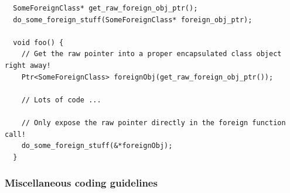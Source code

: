 \begin{itemize}
{\small\begin{verbatim}
  SomeForeignClass* get_raw_foreign_obj_ptr();
  do_some_foreign_stuff(SomeForeignClass* foreign_obj_ptr);

  void foo() {
    // Get the raw pointer into a proper encapsulated class object right away!
    Ptr<SomeForeignClass> foreignObj(get_raw_foreign_obj_ptr());

    // Lots of code ...

    // Only expose the raw pointer directly in the foreign function call! 
    do_some_foreign_stuff(&*foreignObj);
  }
\end{verbatim}}

\end{itemize}


%
\subsubsection{Miscellaneous coding guidelines}
%

